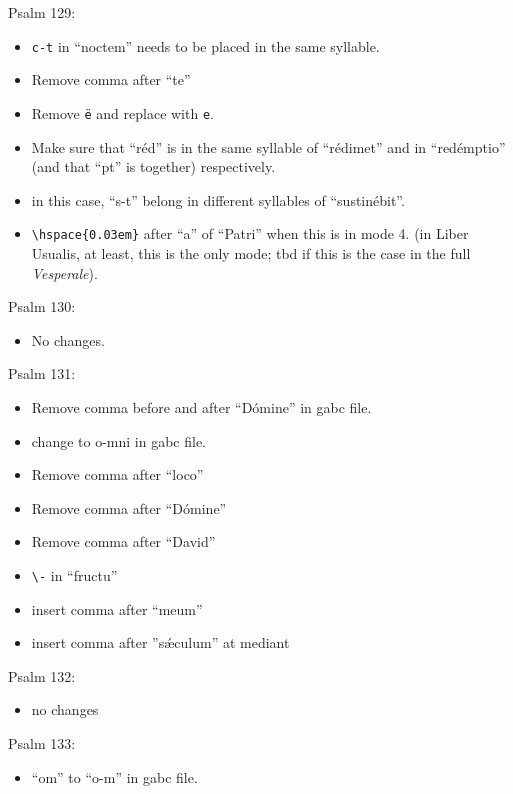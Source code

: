 \documentclass[11pt]{article}
\begin{document}
  Psalm 129:
  \begin{itemize}
  \item  \texttt{c-t} in ``noctem'' needs to be placed in the same syllable.
    \item Remove comma after ``te''
  \item Remove \texttt{ë} and replace with \texttt{e}.
    \item Make sure that ``réd'' is in the same syllable of ``rédimet'' and in ``redémptio'' (and that ``pt'' is together) respectively.
   \item in this case, ``s-t'' belong in different syllables of ``sustinébit''.
    \item \verb|\hspace{0.03em}| after ``a'' of ``Patri'' when this is in mode 4. (in Liber Usualis, at least, this is the only mode; tbd if this is the case in the full \textit{Vesperale}).
 
  \end{itemize}
  
  Psalm 130:
  \begin{itemize}
  \item 
No changes.
    \end{itemize}
  
      Psalm 131:
  \begin{itemize}
  \item Remove comma before and after ``Dómine'' in gabc file.
  \item
 change to o-mni  in gabc file.
  \item   Remove comma after ``loco''
  \item
  Remove comma after ``Dómine''
    \item
  Remove comma after ``David''
  \item
 \verb|\-| in ``fructu''
 \item insert comma after ``meum''
 \item insert comma after ''sǽculum'' at mediant
    \end{itemize}

Psalm 132:
  \begin{itemize}
  \item 
no changes
    \end{itemize}

 Psalm 133:
  \begin{itemize}
  \item 
``om'' to ``o-m'' in gabc file.
    \end{itemize}
\end{document}
